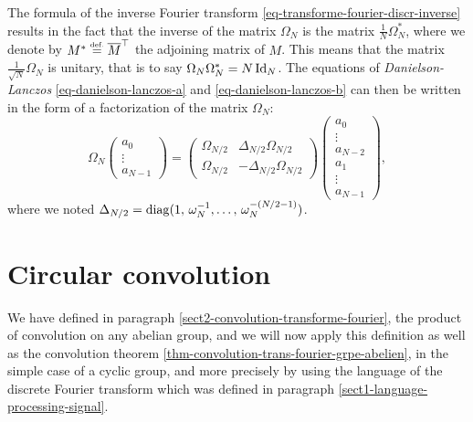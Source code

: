  
\label{notation-47} The formula of the inverse Fourier transform \eqref{eq-transforme-fourier-discr-inverse} results in the fact that the inverse of the matrix $ \Omega_N $ is the matrix $ \frac{1}{N} \Omega_N^* $, where we denote by $ M^* \stackrel{\mbox{\upshape\tiny def.}}{=} \overline{M}^\top $ the adjoining matrix of $ M $. This means that the matrix $ \frac{1}{\sqrt{N}} \Omega_N $ is unitary, that is to say $ \Omega_N \Omega_N^* = N \operatorname{Id}_N $. The equations of \textit{Danielson-Lanczos} \eqref{eq-danielson-lanczos-a} and \eqref{eq-danielson-lanczos-b} can then be written in the form of a factorization of the matrix $ \Omega_N $:
\begin{equation*}
\Omega_N \begin{pmatrix} a_0 \\\vdots \\a_{N-1} \end{pmatrix} = \begin{pmatrix} \Omega_{N / 2} & \Delta_{N / 2} \Omega_{N / 2} \\\Omega_{N / 2} & - \Delta_{N / 2} \Omega_{N / 2} \end{pmatrix} \begin{pmatrix} a_0 \\\vdots \\a_{N-2 } \\a_1 \\\vdots \\a_{N-1} \end{pmatrix},
\end{equation*}
where we noted $ \Delta_{N / 2} = \operatorname{diag} (1, \, \omega_N^{-1}, \ldots, \, \omega_N^{- (N / 2-1)}) $.

\section{Circular convolution}
\label{sect1-tfd-prod-convol} 
 
  We have defined in paragraph \ref{sect2-convolution-transforme-fourier}, the product of convolution on any abelian group, and we will now apply this definition as well as the convolution theorem \ref{thm-convolution-trans-fourier-grpe-abelien}, in the simple case of a cyclic group, and more precisely by using the language of the discrete Fourier transform which was defined in paragraph \ref{sect1-language-processing-signal}.
